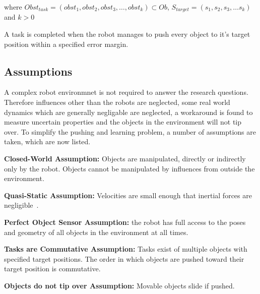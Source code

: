 where $Obst_{task} = (obst_1, obst_2, obst_3, \dots, obst_k) \subset Ob$, $S_{target} = (s_1, s_2, s_3, \dots s_k)$ and $k>0$\bs

A task is completed when the robot manages to push every object to it's target position within a specified error margin. 

\subsection{Assumptions}%
\label{subsec:assumptions}
A complex robot environmnet is not required to answer the research questions. Therefore influences other than the robots are neglected, some real world dynamics which are generally negligable are neglected, a workaround is found to measure uncertain properties and the objects in the environment will not tip over. To simplify the pushing and learning problem, a number of assumptions are taken, which are now listed.\bs

\begin{assumption*}%
\label{assumption:closed_world}
\textbf{Closed-World Assumption:} Objects are manipulated, directly or indirectly only by the robot. Objects cannot be manipulated by influences from outside the environment.
\end{assumption*}\bs

\begin{assumption*}%
\label{assumption:quasi_static}
\textbf{Quasi-Static Assumption:} Velocities are small enough that inertial forces are negligible~\cite{stuber_let_2020}.
\end{assumption*}\bs

\begin{assumption*}%
\label{assumption:perfect_object_sensor}
\textbf{Perfect Object Sensor Assumption:} the robot has full access to the poses and geometry of all objects in the environment at all times.
\end{assumption*}\bs

\begin{assumption*}%
\label{assumption:order_does_not_matter}
\textbf{Tasks are Commutative Assumption:} Tasks exist of multiple objects with specified target positions. The order in which objects are pushed toward their target position is commutative.
\end{assumption*}\bs

\begin{assumption*}%
\label{assumption:no_tipping}
\textbf{Objects do not tip over Assumption:} Movable objects slide if pushed.
\end{assumption*}\bs

